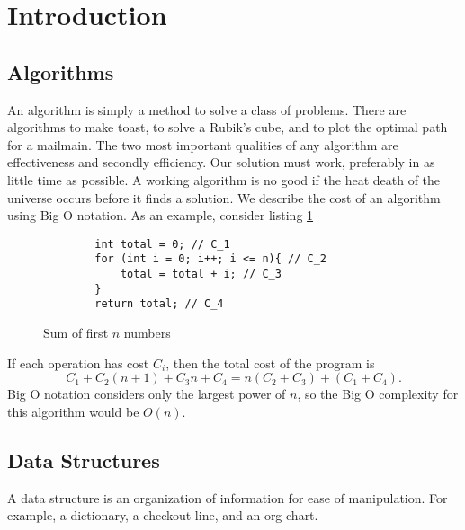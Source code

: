 \section{Introduction}
\subsection{Algorithms}
An algorithm is simply a method
to solve a class of problems.
There are algorithms to make
toast, to solve a Rubik's cube,
and to plot the optimal path
for a mailmain.
The two most important qualities
of any algorithm are effectiveness
and secondly efficiency. Our solution
must work, preferably in as little
time as possible. A working algorithm
is no good if the heat death of the
universe occurs before it finds a
solution.
We describe the cost of an algorithm
using Big O notation. As an example,
consider listing \ref{lst:nsum}
\begin{figure}
    \begin{lstlisting}
        int total = 0; // C_1
        for (int i = 0; i++; i <= n){ // C_2
            total = total + i; // C_3
        }
        return total; // C_4
    \end{lstlisting}
    \caption{Sum of first $n$ numbers}
    \label{lst:nsum}
\end{figure}
If each operation has cost $C_i$,
then the total cost of the program is
\begin{equation}
    C_1 + C_2 (n + 1) + C_3 n + C_4 = n(C_2 + C_3) + (C_1 + C_4).
\end{equation}
Big O notation considers only
the largest power of $n$, so the Big O complexity
for this algorithm would be $O(n)$.

\subsection{Data Structures}
A data structure is an
organization of information for
ease of manipulation. For
example, a dictionary,
a checkout line, and an
org chart.
